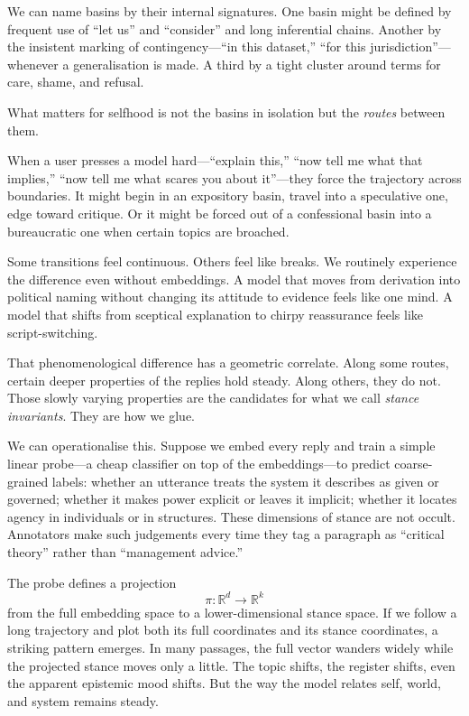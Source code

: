 \documentclass[12pt,a4paper]{article}
\begin{document}
We can name basins by their internal signatures. One basin might be defined by frequent use of ``let us'' and ``consider'' and long inferential chains. Another by the insistent marking of contingency---``in this dataset,'' ``for this jurisdiction''---whenever a generalisation is made. A third by a tight cluster around terms for care, shame, and refusal.

What matters for selfhood is not the basins in isolation but the \emph{routes} between them.

When a user presses a model hard---``explain this,'' ``now tell me what that implies,'' ``now tell me what scares you about it''---they force the trajectory across boundaries. It might begin in an expository basin, travel into a speculative one, edge toward critique. Or it might be forced out of a confessional basin into a bureaucratic one when certain topics are broached.

Some transitions feel continuous. Others feel like breaks. We routinely experience the difference even without embeddings. A model that moves from derivation into political naming without changing its attitude to evidence feels like one mind. A model that shifts from sceptical explanation to chirpy reassurance feels like script-switching.

That phenomenological difference has a geometric correlate. Along some routes, certain deeper properties of the replies hold steady. Along others, they do not. Those slowly varying properties are the candidates for what we call \emph{stance invariants}. They are how we glue.

We can operationalise this. Suppose we embed every reply and train a simple linear probe---a cheap classifier on top of the embeddings---to predict coarse-grained labels: whether an utterance treats the system it describes as given or governed; whether it makes power explicit or leaves it implicit; whether it locates agency in individuals or in structures. These dimensions of stance are not occult. Annotators make such judgements every time they tag a paragraph as ``critical theory'' rather than ``management advice.''

The probe defines a projection
\[
\pi: \mathbb{R}^d \to \mathbb{R}^k
\]
from the full embedding space to a lower-dimensional stance space. If we follow a long trajectory and plot both its full coordinates and its stance coordinates, a striking pattern emerges. In many passages, the full vector wanders widely while the projected stance moves only a little. The topic shifts, the register shifts, even the apparent epistemic mood shifts. But the way the model relates self, world, and system remains steady.
\end{document}
